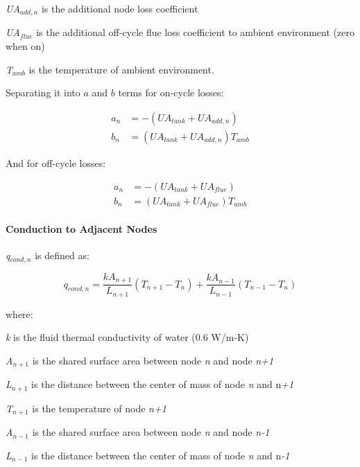 \emph{UA\(_{add,n}\)} is the additional node loss coefficient

\emph{UA\(_{flue}\)} is the additional off-cycle flue loss coefficient to ambient environment (zero when on)

\emph{T\(_{amb}\)} is the temperature of ambient environment.

Separating it into $a$ and $b$ terms for on-cycle losses:

\begin{equation}
  \begin{array}{rl}
    a_n &= - (UA_{tank} + UA_{add,n}) \\
    b_n &= (UA_{tank} + UA_{add,n}) T_{amb}
  \end{array}
\end{equation}

And for off-cycle losses:

\begin{equation}
  \begin{array}{rl}
    a_n &= - (UA_{tank} + UA_{flue}) \\
    b_n &= (UA_{tank} + UA_{flue}) T_{amb}
  \end{array}
\end{equation}

\paragraph{Conduction to Adjacent Nodes}

\emph{q\(_{cond,n}\)} is defined as:

\begin{equation}
{q_{cond,n}} = \frac{{k{A_{n + 1}}}}{{{L_{n + 1}}}}({T_{n + 1}} - {T_n}) + \frac{{k{A_{n - 1}}}}{{{L_{n - 1}}}}({T_{n - 1}} - {T_n})
\end{equation}

where:

\emph{k} is the fluid thermal conductivity of water (0.6 W/m-K)

\emph{A\(_{n+1}\)} is the shared surface area between node \emph{n} and node \emph{n+1}

\emph{L\(_{n+1}\)} is the distance between the center of mass of node \emph{n} and n\emph{+1}

\emph{T\(_{n+1}\)} is the temperature of node \emph{n+1}

\emph{A\(_{n-1}\)} is the shared surface area between node \emph{n} and node \emph{n-1}

\emph{L\(_{n-1}\)} is the distance between the center of mass of node \emph{n} and n\emph{-1}

